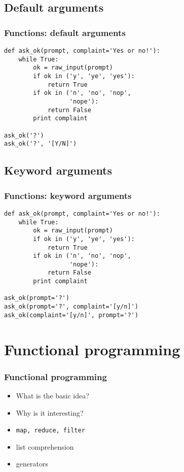 \documentclass[14pt,compress]{beamer}
\newcounter{time}
\newcommand{\inctime}[1]{\addtocounter{time}{#1}{\tiny \thetime\ m}}
\newcommand{\typ}[1]{\texttt{#1}}
\begin{document}
\subsection{Default arguments}
\begin{frame}[fragile]
  \frametitle{Functions: default arguments}
  \small
  \begin{lstlisting}
def ask_ok(prompt, complaint='Yes or no!'):
    while True:
        ok = raw_input(prompt)
        if ok in ('y', 'ye', 'yes'): 
            return True
        if ok in ('n', 'no', 'nop',
                  'nope'): 
            return False
        print complaint

ask_ok('?')
ask_ok('?', '[Y/N]')
  \end{lstlisting}
\end{frame}

\subsection{Keyword arguments}
\begin{frame}[fragile]
  \frametitle{Functions: keyword arguments}
  \small
  \begin{lstlisting}
def ask_ok(prompt, complaint='Yes or no!'):
    while True:
        ok = raw_input(prompt)
        if ok in ('y', 'ye', 'yes'): 
            return True
        if ok in ('n', 'no', 'nop',
                  'nope'): 
            return False
        print complaint

ask_ok(prompt='?')
ask_ok(prompt='?', complaint='[y/n]')
ask_ok(complaint='[y/n]', prompt='?')
\end{lstlisting}
\inctime{15} 
\end{frame}

\section{Functional programming}
\begin{frame}[fragile]
    \frametitle{Functional programming}
    \begin{itemize}
      \item What is the basic idea?
      \item Why is it interesting?
      \item \typ{map, reduce, filter}
      \item list comprehension
      \item generators
    \end{itemize}
\end{frame}
\end{document}
